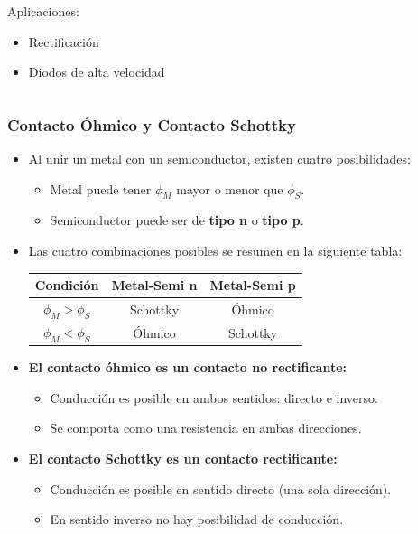 \documentclass[10pt,t,aspectratio=169]{beamer}
\begin{document}
\begin{frame}[t]
\begin{columns}
\begin{column}{0.5\textwidth}
            \flushleft
            Aplicaciones:

            \begin{itemize}
                \item Rectificación
                \item Diodos de alta velocidad
            \end{itemize}
        \end{column}
    \end{columns}
\end{frame}


\begin{frame}[t]
    \frametitle{Contacto Óhmico y Contacto Schottky}

    \begin{itemize}
        \item Al unir un metal con un semiconductor, existen cuatro posibilidades:
        \begin{itemize}
            \item Metal puede tener $\phi_M$ mayor o menor que $\phi_S$.
            \item Semiconductor puede ser de \textbf{tipo n} o \textbf{tipo p}.
        \end{itemize}
        \vspace{3mm}
        \item Las cuatro combinaciones posibles se resumen en la siguiente tabla:
        \begin{tabular}{ccc}
            \hline
            \textbf{Condición} & \textbf{Metal-Semi n} & \textbf{Metal-Semi p} \\
            \hline
            $\phi_M > \phi_S$ & Schottky & Óhmico \\
            $\phi_M < \phi_S$ & Óhmico & Schottky \\
            \hline
        \end{tabular}
        \vspace{3mm}
        \item \textbf{El contacto óhmico es un contacto no rectificante:}
        \begin{itemize}
            \item Conducción es posible en ambos sentidos: directo e inverso.
            \item Se comporta como una resistencia en ambas direcciones.
        \end{itemize}
        \vspace{3mm}
        \item \textbf{El contacto Schottky es un contacto rectificante:}
        \begin{itemize}
            \item Conducción es posible en sentido directo (una sola dirección).
            \item En sentido inverso no hay posibilidad de conducción.
        \end{itemize}
    \end{itemize}
\end{frame}
\end{document}
